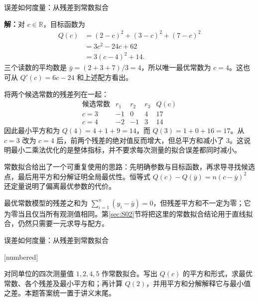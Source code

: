 \documentclass[aspectratio=169,10pt,fontset=fandol]{ctexbeamer}
\makeatletter
\newcommand{\mathagentexerciselabelcontext}[1]{%
\hypertarget<1>{#1}{}%
\edef\@currentHref{#1}%
}
\makeatother
\begin{document}
\begin{frame}[t,fragile]{误差如何度量：从残差到常数拟合}
\footnotesize
{\footnotesize
\par\noindent\textbf{解：}对 $c\in\mathbb{R}$，目标函数为
\[
\begin{aligned}
Q(c)&=(2-c)^2+(3-c)^2+(7-c)^2\\
&=3c^2-24c+62\\
&=3(c-4)^2+14.
\end{aligned}
\]
三个读数的平均数是 $\bar{y}=(2+3+7)/3=4$，所以唯一最优常数为 $c=4$。这也可从 $Q'(c)=6c-24$ 和上述配方看出。


}
{\footnotesize
将两个候选常数的残差列在一起：
\[
\begin{array}{c|rrr|r}
\text{候选常数}&r_1&r_2&r_3&Q(c)\\ \hline
c=3&-1&0&4&17\\
c=4&-2&-1&3&14
\end{array}
\]
因此最小平方和为 $Q(4)=4+1+9=14$，而 $Q(3)=1+0+16=17$。从 $c=3$ 改为 $c=4$ 后，前两个残差的绝对值反而增大，但总平方和减小了 $3$。这说明最小二乘法优化的是整体指标，并不要求每次测量的拟合误差都同时减小。\par

}
{\footnotesize
常数拟合给出了一个可重复使用的思路：先明确参数与目标函数，再求导寻找候选点，最后用平方和分解证明全局最优性。恒等式 $Q(c)-Q(\bar{y})=n(c-\bar{y})^2$ 还定量说明了偏离最优参数的代价。


}
{\footnotesize
最优常数模型的残差之和为 $\sum_{i=1}^{n}(y_i-\bar{y})=0$，但残差平方和不一定为零；它为零当且仅当所有观测值相同。第\ref{sec:S02}节将把这里的常数拟合结论用于直线拟合，仍然只需要一元求导与配方。\par

}
\end{frame}
\begin{frame}[t,fragile]{误差如何度量：从残差到常数拟合}
\normalsize
{\normalsize
[numbered]
\mathagentexerciselabelcontext{mathagent.exercise.U0014.0}
\begin{exercise}
\label{mathagent:exercise:79e91357ee05b8b9aa4c657d553157f1ef411624d282c3f2337dd0e01453ce2d}
对同单位的四次测量值 $1,2,4,5$ 作常数拟合。写出 $Q(c)$ 的平方和形式，求最优常数、各个残差及最小平方和；再计算 $Q(2)$，并用平方和分解解释它与最小值之差。本题答案统一置于讲义末尾。
\end{exercise}
}
\end{frame}
\end{document}
